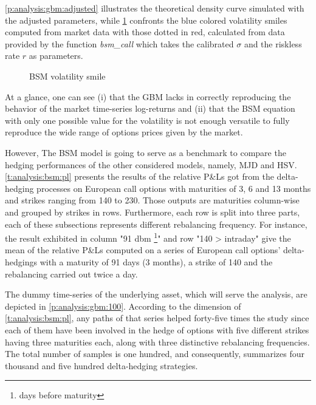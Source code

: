 \documentclass[12pt]{report}
\begin{document}
\cref{p:analysis:gbm:adjusted} illustrates the theoretical density curve simulated with the adjusted parameters, while \cref{p:analysis:gbm:option:adjusted} confronts the blue colored volatility smiles computed from market data with those dotted in red, calculated from data provided by the function \textit{bsm\_call} which takes the calibrated $\sigma$ and the riskless rate $r$ as parameters.

\begin{figure}[h]
  \centering
  
  \caption{BSM volatility smile}
  \label{p:analysis:gbm:option:adjusted}
\end{figure}

At a glance, one can see (i) that the GBM lacks in correctly reproducing the behavior of the market time-series log-returns and (ii) that the BSM equation with only one possible value for the volatility is not enough versatile to fully reproduce the wide range of options prices given by the market.











However, The BSM model is going to serve as a benchmark to compare the hedging performances of the other considered models, namely, MJD and HSV.
\cref{t:analysis:bsm:pl} presents the results of the relative P\&Ls got from the delta-hedging processes on European call options with maturities of 3, 6 and 13 months and strikes ranging from 140 to 230.
Those outputs are maturities column-wise and grouped by strikes in rows.
Furthermore, each row is split into three parts, each of these subsections represents different rebalancing frequency.
For instance, the result exhibited in column "91 dbm \footnote{days before maturity}" and row "140 > intraday" give the mean of the relative P\&Ls computed on a series of European call options' delta-hedgings with a maturity of 91 days (3 months), a strike of 140 and the rebalancing carried out twice a day.

The dummy time-series of the underlying asset, which will serve the analysis, are depicted in \cref{p:analysis:gbm:100}. 
According to the dimension of \cref{t:analysis:bsm:pl}, any paths of that series helped forty-five times the study since each of them have been involved in the hedge of options with five different strikes having three maturities each, along with three distinctive rebalancing frequencies.
The total number of samples is one hundred, and consequently,  summarizes four thousand and five hundred delta-hedging strategies.
\end{document}
